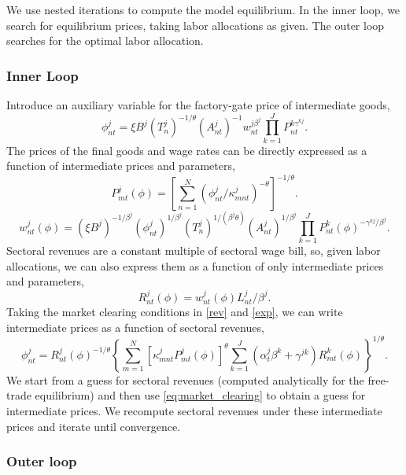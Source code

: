 \documentclass[12pt]{article}
\begin{document}
We use nested iterations to compute the model equilibrium. In the inner loop, we search for equilibrium prices, taking labor allocations as given. The outer loop searches for the optimal labor allocation.

\subsubsection*{Inner Loop}
Introduce an auxiliary variable for the factory-gate price of intermediate goods,
\begin{equation}\label{eq:varrho}
	\phi_{nt}^j = \xi B^j (T_{n}^j)^{-1/\theta} (A_{nt}^j)^{-1} w_{nt}^{j\beta^j} \prod_{k=1}^J P_{nt}^{k\gamma^{kj}}.
\end{equation}
The prices of the final goods and wage rates can be directly expressed as a function of intermediate prices and parameters,
\begin{equation}\label{eq:price}
	P_{mt}^j(\phi) = \left[
		\sum_{n=1}^N (\phi_{nt}^j/\kappa_{mnt}^j)^{-\theta}
		\right]^{-1/\theta}.
\end{equation}
\begin{equation}\label{eq:wage}
	w_{nt}^j(\phi) = (\xi B^j)^{-1/\beta^j}
	(\phi_{nt}^j)^{1/\beta^j}  
	(T_{n}^j)^{1/(\beta^j\theta)}(A_{nt}^j)^{1/\beta^j} 
	\prod_{k=1}^J P_{nt}^k(\phi)^{-\gamma^{kj}/\beta^j}.
\end{equation}
Sectoral revenues are a constant multiple of sectoral wage bill, so, given labor allocations, we can also express them as a function of only intermediate prices and parameters,
\begin{equation}\label{eq:revenue}
	R_{nt}^j(\phi) = w_{nt}^j(\phi)L_{nt}^j/\beta^j.
\end{equation}
Taking the market clearing conditions in \eqref{rev} and \eqref{exp}, we can write intermediate prices as a function of sectoral revenues,
\begin{equation}\label{eq:market_clearing}
	\phi_{nt}^j = R_{nt}^j(\phi)^{-1/\theta}
	\left\{
	\sum_{m=1}^N
		[\kappa_{mnt}^j P_{mt}^j(\phi)]^{\theta}
		\sum_{k=1}^J
			\left( \alpha_{t}^j
				\beta^k 
			+ \gamma^{jk}\right)R_{mt}^k(\phi)
	\right\}^{1/\theta}.
\end{equation}
We start from a guess for sectoral revenues (computed analytically for the free-trade equilibrium) and then use \eqref{eq:market_clearing} to obtain a guess for intermediate prices. We recompute sectoral revenues under these intermediate prices and iterate until convergence.

\subsubsection*{Outer loop}
\end{document}
